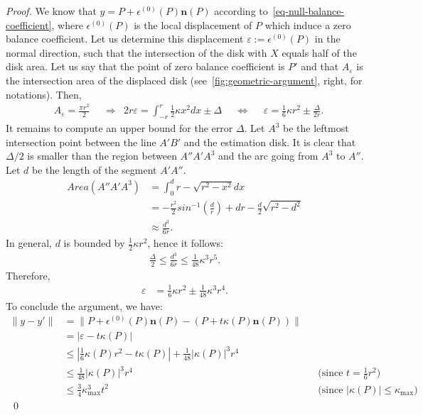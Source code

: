 \documentclass[review]{siamart220329}
\begin{document}
\begin{proof}
  We know that $y = P + \epsilon^{(0)}(P)\mathbf{n}(P)$ according
  to~\cref{eq-null-balance-coefficient}, where $\epsilon^{(0)}(P)$ is
  the local displacement of $P$ which induce a zero balance
  coefficient. Let us determine this displacement $\varepsilon :=
  \epsilon^{(0)}(P)$ in the normal direction, such that the
  intersection of the disk with $X$ equals half of the disk area. Let
  us say that the point of zero balance coefficient is $P'$ and that
  $A_{\varepsilon}$ is the intersection area of the displaced
  disk (see~\cref{fig:geometric-argument}, right, for notations). Then,
%
%
\begin{align*}
	 & A_{\varepsilon} = \frac{\pi r ^2}{2} 
	 && \Rightarrow & 2r\varepsilon = \int_{-r}^{r}{\frac{1}{2}\kappa x^2dx} \pm \Delta 
	&& \Leftrightarrow & & \varepsilon = \frac{1}{6}\kappa r^2 \pm \frac{\Delta}{2r}.
\end{align*}
%
%
It remains to compute an upper bound for the error $\Delta$. Let $A^3$ be the leftmost intersection point between the line $A'B'$ and the estimation disk. It is clear that $\Delta/2$ is smaller than the region between $A''A'A^3$ and the arc going from $A^3$ to $A''$. Let $d$ be the length of the segment $A'A''$. 
%
%
\begin{align*}
	Area(A''A'A^3) &= \int_0^d{r - \sqrt{r^2 - x^2} dx} \\
				   &= -\frac{r^2}{2}sin^{-1}\left(\frac{d}{r}\right) + dr - \frac{d}{2}\sqrt{r^2-d^2} \\
				   &\approx \frac{d^3}{6r}.
\end{align*}
%
%
In general, $d$ is bounded by $\frac{1}{2}\kappa r^2$, hence it follows:
%
%
\begin{align*}
	\frac{\Delta}{2} \leq \frac{d^3}{6r} \leq \frac{1}{48}\kappa^3r^5.
\end{align*}
%
%
Therefore,
%
%
\begin{align*}
	\varepsilon &= \frac{1}{6}\kappa r^2 \pm \frac{1}{48}\kappa^3r^4.
\end{align*}
%
%
To conclude the argument, we have:
\begin{align*}
  \| y - y' \| & = \| P + \epsilon^{(0)}(P)\mathbf{n}(P) - (P+t\kappa(P)\mathbf{n}(P)) \| \\
  & = | \varepsilon - t \kappa(P) | \\
  & \le \left| \frac{1}{6}\kappa(P) r^2 - t\kappa(P) \right| + \frac{1}{48}|\kappa(P)|^3r^4\\
  & \le \frac{1}{48}|\kappa(P)|^3r^4 && \text{(since $t=\frac{1}{6}r^2$)} \\
  & \le \frac{3}{4}\kappa_{\max}^3 t^2 && \text{(since $|\kappa(P)| \le \kappa_{\max}$)}
\end{align*}
\mbox{~}\hfill\qed
\end{proof}
\end{document}
